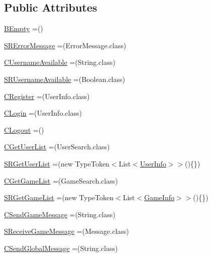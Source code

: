 \subsection*{Public Attributes}
\begin{DoxyCompactItemize}
\item 
\hyperlink{enumsharedlib_1_1conn_1_1_query_a7ac1f270a9ba76e320bf0ce2a88a289f}{B\+Empty} =()
\item 
\hyperlink{enumsharedlib_1_1conn_1_1_query_a8763182a3c749b5e6c26b02e375b53dc}{S\+R\+Error\+Message} =(Error\+Message.\+class)
\item 
\hyperlink{enumsharedlib_1_1conn_1_1_query_a8766bb4267f59d52ba82acbdb4d0b314}{C\+Username\+Available} =(String.\+class)
\item 
\hyperlink{enumsharedlib_1_1conn_1_1_query_a98a79e98326c0c34f6bfeaf1e42f2648}{S\+R\+Username\+Available} =(Boolean.\+class)
\item 
\hyperlink{enumsharedlib_1_1conn_1_1_query_a8642336ee80fc5ec0f02531f64b94fbe}{C\+Register} =(User\+Info.\+class)
\item 
\hyperlink{enumsharedlib_1_1conn_1_1_query_aea56634d75f246edb84fc81d18c7c713}{C\+Login} =(User\+Info.\+class)
\item 
\hyperlink{enumsharedlib_1_1conn_1_1_query_afc2a083454cba81038adceb4cd48ecf2}{C\+Logout} =()
\item 
\hyperlink{enumsharedlib_1_1conn_1_1_query_ae5ad3e5d72c454bea8933cc09c8a6a59}{C\+Get\+User\+List} =(User\+Search.\+class)
\item 
\hyperlink{enumsharedlib_1_1conn_1_1_query_ab9bac40bb2fe89f9191824bbe1cb4436}{S\+R\+Get\+User\+List} =(new Type\+Token$<$List$<$\hyperlink{classsharedlib_1_1tuples_1_1_user_info}{User\+Info}$>$$>$()\{\})
\item 
\hyperlink{enumsharedlib_1_1conn_1_1_query_ae1f5629ed4a2fa6edbe873b3d34f2c70}{C\+Get\+Game\+List} =(Game\+Search.\+class)
\item 
\hyperlink{enumsharedlib_1_1conn_1_1_query_a8f1920c9e5c361e835794de6995ad4cf}{S\+R\+Get\+Game\+List} =(new Type\+Token$<$List$<$\hyperlink{classsharedlib_1_1tuples_1_1_game_info}{Game\+Info}$>$$>$()\{\})
\item 
\hyperlink{enumsharedlib_1_1conn_1_1_query_a815b1d848b33445e9489f6da81e91e73}{C\+Send\+Game\+Message} =(String.\+class)
\item 
\hyperlink{enumsharedlib_1_1conn_1_1_query_a34ddcc74f8326d320a4cffedc2f9a647}{S\+Receive\+Game\+Message} =(Message.\+class)
\item 
\hyperlink{enumsharedlib_1_1conn_1_1_query_a67eb88813c5eca451aaea113583641a5}{C\+Send\+Global\+Message} =(String.\+class)

\end{DoxyCompactItemize}
